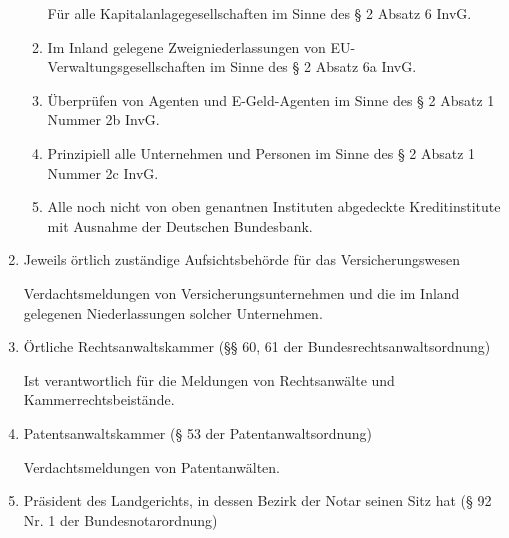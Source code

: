 \documentclass{article}
\begin{document}
\begin{enumerate}
\begin{enumerate}
                            Für alle Kapitalanlagegesellschaften im Sinne des § 2 Absatz 6 InvG.

                        \item

                            Im Inland gelegene Zweigniederlassungen von EU-
                            Verwaltungsgesellschaften im Sinne des § 2 Absatz 6a InvG.

                        \item

                            Überprüfen von Agenten und E-Geld-Agenten im Sinne des § 2 Absatz 1 Nummer 2b InvG.

                        \item

                            Prinzipiell alle Unternehmen und Personen im Sinne des § 2 Absatz 1 Nummer 2c InvG.

                        \item
                            
                            Alle noch nicht von oben genantnen Instituten abgedeckte Kreditinstitute mit Ausnahme der Deutschen Bundesbank.

                    \end{enumerate}

                \item Jeweils örtlich zuständige Aufsichtsbehörde für das Versicherungswesen

                    Verdachtsmeldungen von Versicherungsunternehmen und die im Inland gelegenen Niederlassungen solcher Unternehmen.

\newpage

                \item Örtliche Rechtsanwaltskammer (§§ 60, 61 der Bundesrechtsanwaltsordnung)

                    Ist verantwortlich für die Meldungen von Rechtsanwälte und Kammerrechtsbeistände.

                \item  Patentsanwaltskammer (§ 53 der Patentanwaltsordnung)
                    
                    Verdachtsmeldungen von Patentanwälten.

                \item Präsident des Landgerichts, in dessen Bezirk der Notar seinen Sitz hat (§ 92 Nr. 1 der Bundesnotarordnung)


\end{enumerate}
\end{document}
